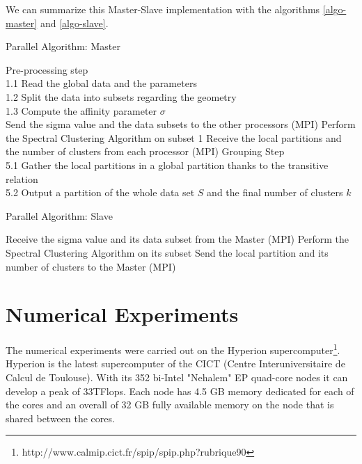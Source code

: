 \documentclass[runningheads,a4paper]{llncs}
\begin{document}
We can summarize this Master-Slave implementation with the algorithms
\ref{algo-master} and \ref{algo-slave}.

\begin{algorithm}
\caption{Parallel Algorithm: Master}
\label{algo-master}
\begin{algorithmic}[1]
  \STATE Pre-processing step\\
        1.1 Read the global data and the parameters\\
        1.2 Split the data into subsets regarding the geometry\\
        1.3 Compute the affinity parameter $\sigma$\\
  \STATE Send the sigma value and the data subsets to the other processors
         (MPI)
  \STATE Perform the Spectral Clustering Algorithm on subset 1
  \STATE Receive the local partitions and the number of clusters from each
         processor (MPI)
  \STATE Grouping Step\\
         5.1 Gather the local partitions in a global
         partition thanks to the transitive relation\\
         5.2 Output a partition of the whole data
         set $S$ and the final number of clusters $k$
\end{algorithmic}
\end{algorithm}

\begin{algorithm}
\caption{Parallel Algorithm: Slave}
\label{algo-slave}
\begin{algorithmic}[1]
  \STATE Receive the sigma value and its data subset from the Master
         (MPI)
  \STATE Perform the Spectral Clustering Algorithm on its subset
  \STATE Send the local partition and its number of clusters to the Master
         (MPI)
\end{algorithmic}
\end{algorithm}

\pagebreak[4]

\section{Numerical Experiments} \label{numerical}

The numerical experiments were carried out on the Hyperion
supercomputer\footnote{http://www.calmip.cict.fr/spip/spip.php?rubrique90}.
Hyperion is the latest supercomputer of the CICT (Centre Interuniversitaire de
Calcul de Toulouse). With its 352 bi-Intel "Nehalem" EP quad-core nodes it can
develop a peak of 33TFlops. Each node has 4.5 GB memory dedicated for each of
the cores and an overall of 32 GB fully available memory on the node that is
shared between the cores.
\end{document}

